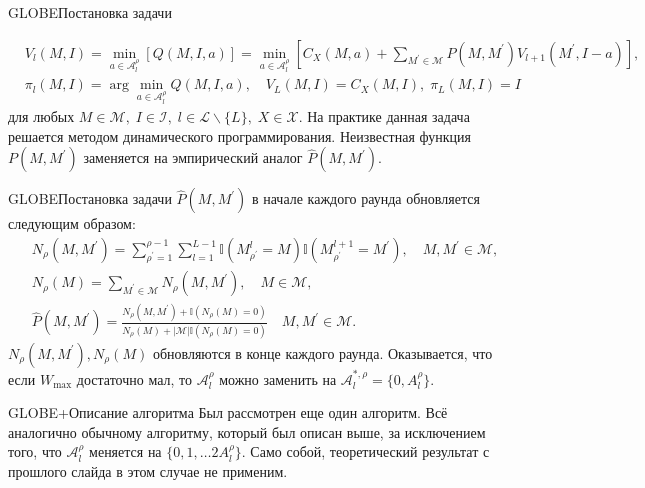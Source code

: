 \documentclass[aspectratio=169]{beamer}
\begin{document}
        
        \begin{frame}{GLOBE}{Постановка задачи}

            \begin{align*}
                &V_l(M, I) =\min\limits_{a \in \mathcal A_l^\rho}\left[ Q(M, I, a) \right] =\min\limits_{a \in \mathcal A_l^\rho} \left[C_X(M, a) + \sum\limits_{M^\prime \in \mathcal M} P(M, M^\prime) V_{l+1}(M^\prime, I - a ) \right], \\
                &\pi_l(M,I) = \arg\min\limits_{a \in \mathcal A_l^\rho}Q(M, I, a), \quad V_L(M,I) = C_X(M,I), \; \pi_L(M,I) = I
            \end{align*}
            для любых $M \in \mathcal M, \; I \in \mathcal I, \; l \in \mathcal L \backslash \{L\}, \; X \in \mathcal X $.
            На практике данная задача решается методом динамического программирования. 
            Неизвестная функция $P(M, M^\prime)$ заменяется на эмпирический аналог $\hat P(M, M^\prime)$.

        \end{frame}

        \begin{frame}{GLOBE}{Постановка задачи}
            $\hat P(M, M^\prime)$ в начале каждого раунда обновляется следующим образом:
            \begin{align*}
                &N_\rho(M, M^\prime) = \sum\limits_{\rho^\prime = 1}^{\rho - 1} \sum\limits_{l = 1}^{L - 1} \mathbb I (M_{\rho^\prime}^l = M)\mathbb I (M_{\rho^\prime}^{l + 1} = M^\prime), \quad M, M^\prime \in \mathcal M, \\
                &N_\rho(M) = \sum\limits_{M^\prime \in \mathcal M} N_\rho(M, M^\prime), \quad M \in \mathcal M,\\
                &\hat P(M, M^\prime) = \frac{N_\rho(M, M^\prime) + \mathbb I (N_\rho(M) = 0 ) } {N_\rho (M) + |\mathcal M| \mathbb I (N_\rho(M) = 0 )} \quad M, M^\prime \in \mathcal M.
            \end{align*}
            $N_\rho(M, M^\prime), N_\rho(M)$ обновляются в конце каждого раунда.
            Оказывается, что если $W_{\max}$ достаточно мал, то $\mathcal A_l^\rho$ можно заменить на $\mathcal A_l^{*,\rho} = \{0, A_l^\rho \}$.
            
        \end{frame}

        \begin{frame}{GLOBE+}{Описание алгоритма}
            Был рассмотрен еще один алгоритм. Всё аналогично обычному алгоритму, который был описан выше, за исключением того, что $\mathcal A_l^\rho$ меняется на $\{0,1,\ldots 2A_l^\rho\}$.
            Само собой, теоретический результат с прошлого слайда в этом случае не применим.

        \end{frame}
\end{document}
